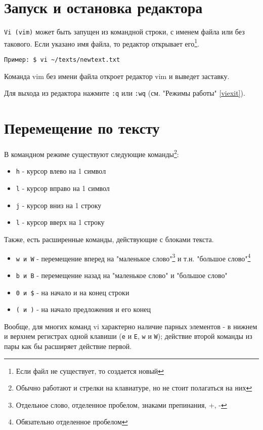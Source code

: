 \section{Запуск и остановка редактора}

\verb+Vi (vim)+ может быть запущен из командной строки, с именем файла или без такового. Если указано имя файла, то редактор открывает его\footnote{Если файл не существует, то создается новый}.

\verb+Пример: $ vi ~/texts/newtext.txt+

Команда vim без имени файла откроет редактор vim и выведет заставку.

Для выхода из редактора нажмите \verb+:q+ или \verb+:wq+ (см. "Режимы работы" \ref{viexit}). 


\section{Перемещение по тексту}

В командном режиме существуют следующие команды\footnote{Обычно работают и стрелки на клавиатуре, но не стоит полагаться на них}:
\begin{itemize}
\item \verb+h+ - курсор влево на 1 символ
\item \verb+l+ - курсор вправо на 1 символ
\item \verb+j+ - курсор вниз на 1 строку
\item \verb+l+ - курсор вверх на 1 строку
\end{itemize}

Также, есть расширенные команды, действующие с блоками текста.
\begin{itemize}
\item \verb+w и W+ - перемещение вперед на "маленькое слово"\footnote{Отдельное слово, отделенное пробелом, знаками препинания, +, -} и т.н. "большое слово"\footnote{Обязательно отделенное пробелом} 
\item \verb+b и B+ - перемещение назад на "маленькое слово" и "большое слово" 
\item \verb+0 и $+ - на начало и на конец строки
\item \verb+( и )+ - на начало предложения и его конец 
\end{itemize}


Вообще, для многих команд vi характерно наличие парных элементов - в нижнем и верхнем регистрах одной клавиши (\verb+e+ и \verb+E+, \verb+w+ и \verb+W+); действие второй команды из пары как бы расширяет действие первой.

